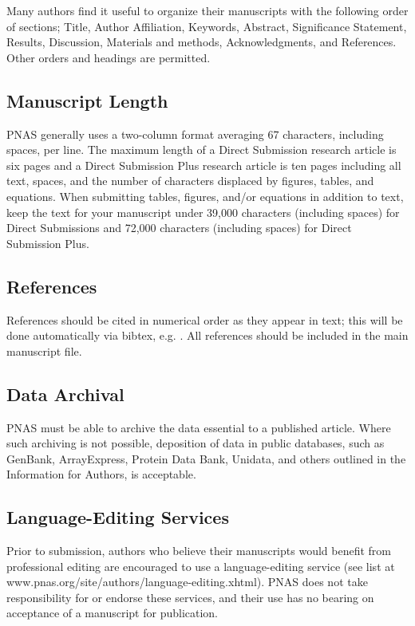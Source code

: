 \documentclass[9pt,twocolumn,twoside,lineno]{pnas-new}
\begin{document}
Many authors find it useful to organize their manuscripts with the following order of sections;  Title, Author Affiliation, Keywords, Abstract, Significance Statement, Results, Discussion, Materials and methods, Acknowledgments, and References. Other orders and headings are permitted.

\subsection*{Manuscript Length}

PNAS generally uses a two-column format averaging 67 characters, including spaces, per line. The maximum length of a Direct Submission research article is six pages and a Direct Submission Plus research article is ten pages including all text, spaces, and the number of characters displaced by figures, tables, and equations.  When submitting tables, figures, and/or equations in addition to text, keep the text for your manuscript under 39,000 characters (including spaces) for Direct Submissions and 72,000 characters (including spaces) for Direct Submission Plus.

\subsection*{References}

References should be cited in numerical order as they appear in text; this will be done automatically via bibtex, e.g. . All references should be included in the main manuscript file.  

\subsection*{Data Archival}

PNAS must be able to archive the data essential to a published article. Where such archiving is not possible, deposition of data in public databases, such as GenBank, ArrayExpress, Protein Data Bank, Unidata, and others outlined in the Information for Authors, is acceptable.

\subsection*{Language-Editing Services}
Prior to submission, authors who believe their manuscripts would benefit from professional editing are encouraged to use a language-editing service (see list at www.pnas.org/site/authors/language-editing.xhtml). PNAS does not take responsibility for or endorse these services, and their use has no bearing on acceptance of a manuscript for publication. 
\end{document}
